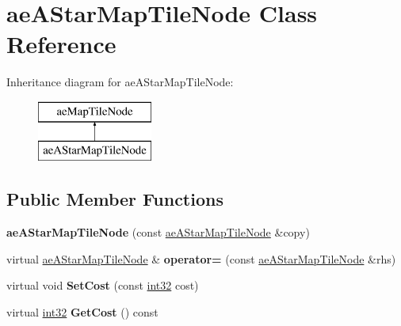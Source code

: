 \hypertarget{classae_a_star_map_tile_node}{}\section{ae\+A\+Star\+Map\+Tile\+Node Class Reference}
\label{classae_a_star_map_tile_node}
Inheritance diagram for ae\+A\+Star\+Map\+Tile\+Node\+:\begin{figure}[H]
\begin{center}
\leavevmode
\includegraphics[height=2.000000cm]{classae_a_star_map_tile_node}
\end{center}
\end{figure}
\subsection*{Public Member Functions}
\begin{DoxyCompactItemize}
\item 
{\bfseries ae\+A\+Star\+Map\+Tile\+Node} (const \hyperlink{classae_a_star_map_tile_node}{ae\+A\+Star\+Map\+Tile\+Node} \&copy)\hypertarget{classae_a_star_map_tile_node_a3a28c8095b51996f6f1774c14699c81d}{}\label{classae_a_star_map_tile_node_a3a28c8095b51996f6f1774c14699c81d}

\item 
virtual \hyperlink{classae_a_star_map_tile_node}{ae\+A\+Star\+Map\+Tile\+Node} \& {\bfseries operator=} (const \hyperlink{classae_a_star_map_tile_node}{ae\+A\+Star\+Map\+Tile\+Node} \&rhs)\hypertarget{classae_a_star_map_tile_node_ac113dd7d8732e2030012f3cfd71302ed}{}\label{classae_a_star_map_tile_node_ac113dd7d8732e2030012f3cfd71302ed}

\item 
virtual void {\bfseries Set\+Cost} (const \hyperlink{namespaceae_core_a862bc39eb87cfabca273f49e2a920129}{int32} cost)\hypertarget{classae_a_star_map_tile_node_ad12ae4cc9a10248ac05cd3c4414048d4}{}\label{classae_a_star_map_tile_node_ad12ae4cc9a10248ac05cd3c4414048d4}

\item 
virtual \hyperlink{namespaceae_core_a862bc39eb87cfabca273f49e2a920129}{int32} {\bfseries Get\+Cost} () const \hypertarget{classae_a_star_map_tile_node_a0cdbab3cfca6974bade79bf11d2297f4}{}\label{classae_a_star_map_tile_node_a0cdbab3cfca6974bade79bf11d2297f4}

\end{DoxyCompactItemize}
